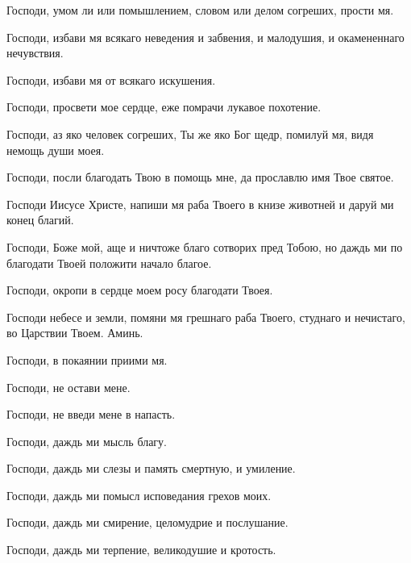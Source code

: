    Господи, умом ли или помышлением, словом или делом согреших, прости
мя.



   Господи, избави мя всякаго неведения и забвения, и малодушия, и
окамененнаго нечувствия.



   Господи, избави мя от всякаго искушения.



   Господи, просвети мое сердце, еже помрачи лукавое похотение.



   Господи, аз яко человек согреших, Ты же яко Бог щедр, помилуй мя,
видя немощь души моея.



   Господи, посли благодать Твою в помощь мне, да прославлю имя Твое
святое.



   Господи Иисусе Христе, напиши мя раба Твоего в книзе животней и
даруй ми конец благий.



   Господи, Боже мой, аще и ничтоже благо сотворих пред Тобою, но даждь
ми по благодати Твоей положити начало благое.



   Господи, окропи в сердце моем росу благодати Твоея.



   Господи небесе и земли, помяни мя грешнаго раба Твоего, студнаго и
нечистаго, во Царствии Твоем. Аминь.



   Господи, в покаянии приими мя.



   Господи, не остави мене.



   Господи, не введи мене в напасть.



   Господи, даждь ми мысль благу.



   Господи, даждь ми слезы и память смертную, и умиление.



   Господи, даждь ми помысл исповедания грехов моих.



   Господи, даждь ми смирение, целомудрие и послушание.



   Господи, даждь ми терпение, великодушие и кротость.



